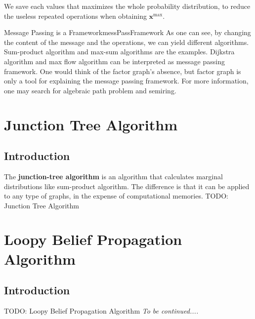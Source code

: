 \documentclass{article}
\begin{document}
        We save each values that maximizes the whole probability distribution, to reduce the
        useless repeated operations when obtaining $\textbf{x}^{\max}$.

        \begin{rem}{Message Passing is a Framework}{messPassFramework}
            As one can see, by changing the content of the message and the operations, we can yield different algorithms.
            Sum-product algorithm and max-sum algorithms are the examples. Dijkstra algorithm and max flow
            algorithm can be interpreted as message passing framework. One would think of the factor graph's absence, but factor graph is only a tool for
            explaining the message passing framework. For more information, one may search for algebraic path problem and semiring.
        \end{rem}

\section{Junction Tree Algorithm}
    \subsection{Introduction}
        The \textbf{junction-tree algorithm} is an algorithm that calculates marginal distributions like sum-product algorithm.
        The difference is that it can be applied to any type of graphs, in the expense of computational memories.
        TODO: Junction Tree Algorithm
\section{Loopy Belief Propagation Algorithm}\label{sec:loopyBeliefPropAlg}
    \subsection{Introduction}
        TODO: Loopy Belief Propagation Algorithm
        \emph{To be continued....}
\end{document}

